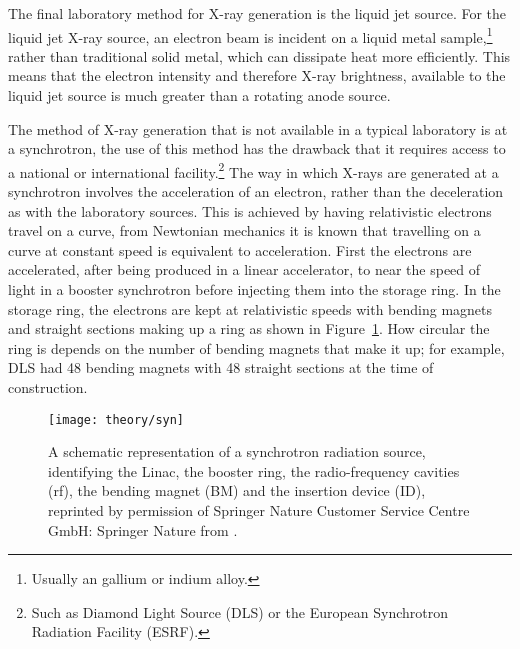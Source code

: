 The final laboratory method for X-ray generation is the liquid jet source.\autocite[][Branded MetalJet by excillum]{noauthor_metaljet_nodate}
For the liquid jet X-ray source, an electron beam is incident on a liquid metal sample,\footnote{Usually an gallium or indium alloy.} rather than traditional solid metal, which can dissipate heat more efficiently.
This means that the electron intensity and therefore X-ray brightness, available to the liquid jet source is much greater than a rotating anode source.

The method of X-ray generation that is not available in a typical laboratory is at a synchrotron, the use of this method has the drawback that it requires access to a national or international facility.\footnote{Such as Diamond Light Source (DLS) or the European Synchrotron Radiation Facility (ESRF).}
The way in which X-rays are generated at a synchrotron involves the acceleration of an electron, rather than the deceleration as with the laboratory sources.
This is achieved by having relativistic electrons travel on a curve, from Newtonian mechanics it is known that travelling on a curve at constant speed is equivalent to acceleration.
First the electrons are accelerated, after being produced in a linear accelerator, to near the speed of light in a booster synchrotron before injecting them into the storage ring.
In the storage ring, the electrons are kept at relativistic speeds with bending magnets and straight sections making up a ring as shown in Figure~\ref{fig:syn}.
How circular the ring is depends on the number of bending magnets that make it up; for example, DLS had \num{48} bending magnets with \num{48} straight sections at the time of construction.
%
\begin{figure}
    \centering
    \texttt{[image: theory/syn]}
    \caption{A schematic representation of a synchrotron radiation source, identifying the Linac, the booster ring, the radio-frequency cavities (rf), the bending magnet (BM) and the insertion device (ID), reprinted by permission of Springer Nature Customer Service Centre GmbH: Springer Nature from \cite{garcia-gutierrez_bases_2009}.}
    \label{fig:syn}
\end{figure}
%

